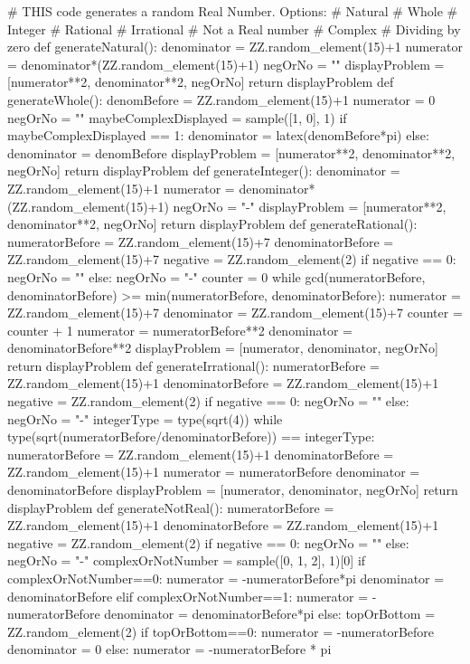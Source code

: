 \documentclass{ximera}
\begin{document}
\begin{sagesilent}
	# THIS code generates a random Real Number. Options:
	# Natural
	# Whole
	# Integer
	# Rational
	# Irrational
	# Not a Real number
	# Complex
	# Dividing by zero
	def generateNatural():
	denominator = ZZ.random_element(15)+1
	numerator = denominator*(ZZ.random_element(15)+1)
	negOrNo = ""
	displayProblem = [numerator**2, denominator**2, negOrNo]
	return displayProblem
	def generateWhole():
	denomBefore = ZZ.random_element(15)+1
	numerator = 0
	negOrNo = ""
	maybeComplexDisplayed = sample([1, 0], 1)
	if maybeComplexDisplayed == 1:
	denominator = latex(denomBefore*pi)
	else:
	denominator = denomBefore
	displayProblem = [numerator**2, denominator**2, negOrNo]
	return displayProblem
	def generateInteger():
	denominator = ZZ.random_element(15)+1
	numerator = denominator*(ZZ.random_element(15)+1)
	negOrNo = "-"
	displayProblem = [numerator**2, denominator**2, negOrNo]
	return displayProblem
	def generateRational():
	numeratorBefore = ZZ.random_element(15)+7
	denominatorBefore = ZZ.random_element(15)+7
	negative = ZZ.random_element(2)
	if negative == 0:
	negOrNo = ""
	else:
	negOrNo = "-"
	counter = 0
	while gcd(numeratorBefore, denominatorBefore) >= min(numeratorBefore, denominatorBefore):
	numerator = ZZ.random_element(15)+7
	denominator = ZZ.random_element(15)+7
	counter = counter + 1
	numerator = numeratorBefore**2
	denominator = denominatorBefore**2
	displayProblem = [numerator, denominator, negOrNo]
	return displayProblem
	def generateIrrational():
	numeratorBefore = ZZ.random_element(15)+1
	denominatorBefore = ZZ.random_element(15)+1
	negative = ZZ.random_element(2)
	if negative == 0:
	negOrNo = ""
	else:
	negOrNo = "-"
	integerType = type(sqrt(4))
	while type(sqrt(numeratorBefore/denominatorBefore)) == integerType:
	numeratorBefore = ZZ.random_element(15)+1
	denominatorBefore = ZZ.random_element(15)+1
	numerator = numeratorBefore
	denominator = denominatorBefore
	displayProblem = [numerator, denominator, negOrNo]
	return displayProblem
	def generateNotReal():
	numeratorBefore = ZZ.random_element(15)+1
	denominatorBefore = ZZ.random_element(15)+1
	negative = ZZ.random_element(2)
	if negative == 0:
	negOrNo = ""
	else:
	negOrNo = "-"
	complexOrNotNumber = sample([0, 1, 2], 1)[0]
	if complexOrNotNumber==0:
	numerator = -numeratorBefore*pi
	denominator = denominatorBefore
	elif complexOrNotNumber==1:
	numerator = -numeratorBefore
	denominator = denominatorBefore*pi
	else:
	topOrBottom = ZZ.random_element(2)
	if topOrBottom==0:
	numerator = -numeratorBefore
	denominator = 0
	else:
	numerator = -numeratorBefore * pi

\end{sagesilent}
\end{document}
